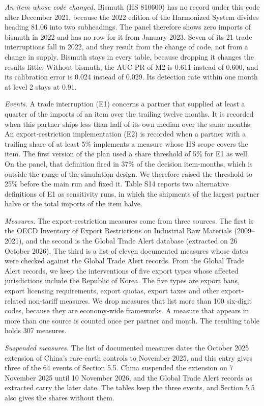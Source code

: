 \documentclass[10pt,a4paper]{article}
\begin{document}
\textit{An item whose code changed.} Bismuth (HS 810600) has no record under this code after December 2021, because the 2022 edition of the Harmonized System divides heading 81.06 into two subheadings. The panel therefore shows zero imports of bismuth in 2022 and has no row for it from January 2023. Seven of its 21 trade interruptions fall in 2022, and they result from the change of code, not from a change in supply. Bismuth stays in every table, because dropping it changes the results little. Without bismuth, the AUC-PR of M2 is 0.611 instead of 0.600, and its calibration error is 0.024 instead of 0.029. Its detection rate within one month at level 2 stays at 0.91.

\textit{Events.} A trade interruption (E1) concerns a partner that supplied at least a quarter of the imports of an item over the trailing twelve months. It is recorded when this partner ships less than half of its own median over the same months. An export-restriction implementation (E2) is recorded when a partner with a trailing share of at least 5\% implements a measure whose HS scope covers the item. The first version of the plan used a share threshold of 5\% for E1 as well. On the panel, that definition fired in 37\% of the decision item-months, which is outside the range of the simulation design. We therefore raised the threshold to 25\% before the main run and fixed it. Table S14 reports two alternative definitions of E1 as sensitivity runs, in which the shipments of the largest partner halve or the total imports of the item halve.

\textit{Measures.} The export-restriction measures come from three sources. The first is the OECD Inventory of Export Restrictions on Industrial Raw Materials (2009--2021), and the second is the Global Trade Alert database (extracted on 26 October 2026). The third is a list of eleven documented measures whose dates were checked against the Global Trade Alert records. From the Global Trade Alert records, we keep the interventions of five export types whose affected jurisdictions include the Republic of Korea. The five types are export bans, export licensing requirements, export quotas, export taxes and other export-related non-tariff measures. We drop measures that list more than 100 six-digit codes, because they are economy-wide frameworks. A measure that appears in more than one source is counted once per partner and month. The resulting table holds 307 measures.

\textit{Suspended measures.} The list of documented measures dates the October 2025 extension of China's rare-earth controls to November 2025, and this entry gives three of the 64 events of Section 5.5. China suspended the extension on 7 November 2025 until 10 November 2026, and the Global Trade Alert records as extracted carry the later date. The tables keep the three events, and Section 5.5 also gives the shares without them.
\end{document}
